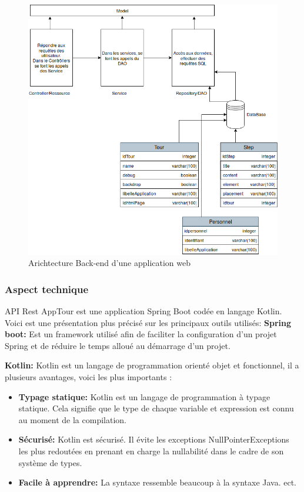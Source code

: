 \documentclass[12pt]{article}
\begin{document}
\begin{figure}[H]
	\centering
 		\includegraphics[width=1\textwidth]{diagrammes/Architecture_Apptour.png}
  		\caption{Arichtecture Back-end d'une application web}
	\end{figure}
	



\subsubsection{Aspect technique}

API Rest AppTour est une application Spring Boot codée en langage Kotlin. Voici est une présentation plus précisé sur les principaux  
outils utilisés: 
\textbf{Spring boot:} Est un framework utilisé afin de faciliter la configuration d'un projet Spring et de réduire le temps alloué au démarrage d'un projet.

\textbf{Kotlin:} Kotlin est un langage de programmation orienté objet et fonctionnel, il a plusieurs avantages, voici les plus importants :
\begin{itemize}
\item \textbf{Typage statique: } Kotlin est un langage de programmation à typage statique. Cela signifie que le type de chaque variable et expression est connu au moment de la compilation.
\item \textbf{Sécurisé: } Kotlin est sécurisé. Il évite les exceptions NullPointerExceptions les plus redoutées en prenant en charge la nullabilité dans le cadre de son système de types.
\item \textbf{Facile à apprendre: } La syntaxe ressemble beaucoup à la syntaxe Java.
ect.
\end{itemize} 
\end{document}
